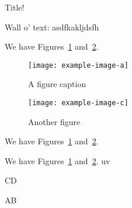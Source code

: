 \documentclass{article}
\begin{document}
\begin{center}
    Title!
\end{center}

Wall o' text: asdfkakljdsfh

\blindtext

We have Figures~\ref{fig:caption-a} and~\ref{fig:caption-c}.

\begin{figure}[ht]
  \centering\texttt{[image: example-image-a]}
  \caption{A figure caption}\label{fig:caption-a}
\end{figure}

\begin{figure}[ht]
  \centering\texttt{[image: example-image-c]}
  \caption{Another figure}\label{fig:caption-c}
\end{figure}

We have Figures~\ref{fig:caption-a} and~\ref{fig:caption-c}.

\pagebreak
We have Figures~\ref{fig:caption-a} and~\ref{fig:caption-c}. uv

CD 

AB
\end{document}
